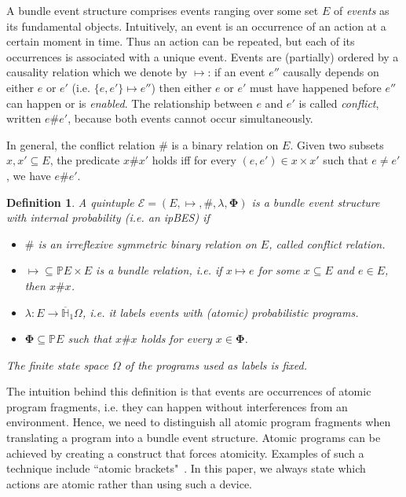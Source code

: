 \documentclass[review]{elsart}
\newtheorem{definition}{Definition}[section]
\renewcommand{\P}{\mathbb{P}}
\newcommand{\Hip}{\overline{\mathbb{H}}_1}
\newcommand{\EE}{\mathcal{E}}
\newcommand{\exit}{\mathbf{\Phi}}
\newcommand{\Tx}{\color{orange}}
\begin{document}
{\Tx
A bundle event structure comprises events ranging over some set $E$ of \emph{events} as its fundamental objects. Intuitively, an event is an occurrence of an action at a certain moment in time. Thus an action can be repeated, but each of its occurrences is associated with a unique event. Events are (partially) ordered by a causality relation which we denote by $\mapsto$: if an event $e''$ causally depends on either $e$ or $e'$ (i.e. $\{e,e'\}{\mapsto} e''$) then either $e$ or $e'$ must have happened before $e''$ can happen or is \emph{enabled}. The relationship between $e$ and $e'$ is called \emph{conflict}, written $e\#e'$, because both events cannot occur simultaneously.
}

In general, the conflict relation $\#$ is a binary relation on $E$. Given two subsets $x,x'\subseteq E$, the predicate $x\#x'$ holds iff for every $(e,e'){\in} x{\times} x'$ such that $e{\neq}e'$, we have $e\#e'$. 

\begin{definition}\label{def:ipbes}
A quintuple $\EE = (E,\mapsto,\#,\lambda,\exit)$ is a \emph{bundle event structure with internal probability} (i.e. an ipBES) if 
\begin{itemize}
\item $\#$ is an irreflexive symmetric binary relation on $E$, called \emph{conflict relation}. 
\item $\mapsto\subseteq\P E{\times} E$ is a \emph{bundle relation}, i.e. if $x{\mapsto} e$ for some $x\subseteq E$ and $e{\in} E$, then $x\#x$. 
\item $\lambda{:}E{\to}\Hip\Omega$, i.e. it labels events with (atomic) probabilistic programs.
\item $\exit\subseteq \P E$ such that $x\#x$ holds  for every $x{\in}\exit$.
\end{itemize}
 
The finite state space $\Omega$ of the programs used as labels is fixed.
\end{definition} 

The intuition behind this definition is that events are occurrences of atomic program fragments, i.e. they can happen without interferences from an environment. Hence, we need to distinguish all atomic program fragments when translating a program into a bundle event structure. Atomic programs can be achieved by creating a construct that forces atomicity. Examples of such a technique include ``atomic brackets"~\cite{Jon12}. In this paper, we always state which actions are atomic rather than using such a device.
\end{document}
